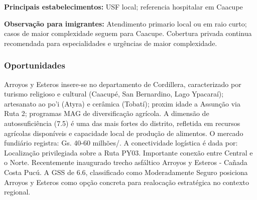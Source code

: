 \textbf{Principais estabelecimentos:} USF local; referencia hospitalar
em Caacupe

\textbf{Observação para imigrantes:} Atendimento primario local ou em
raio curto; casos de maior complexidade seguem para Caacupe. Cobertura
privada continua recomendada para especialidades e urgências de maior
complexidade.
\newpage

\subsubsection*{Oportunidades}\label{oport-arroyos-y-esteros-0303}
Arroyos y Esteros insere-se no departamento de Cordillera, caracterizado por turismo religioso e cultural (Caacupé, San Bernardino, Lago Ypacaraí); artesanato ao po'i (Atyra) e cerâmica (Tobatí); proxim idade a Assunção via Ruta 2; programas MAG de diversificação agrícola. A dimensão de autossuficiência (7.5) é uma das mais fortes do distrito, refletida em recursos agrícolas disponíveis e capacidade local de produção de alimentos. O mercado fundiário registra: Gs. 40-60 milhões/. A conectividade logística é dada por: Localização privilegiada sobre a Ruta PY03. Importante conexão entre Central e o Norte. Recentemente inaugurado trecho asfáltico Arroyos y Esteros - Cañada Costa Pucú. A GSS de 6.6, classificado como Moderadamente Seguro posiciona Arroyos y Esteros como opção concreta para realocação estratégica no contexto regional.

